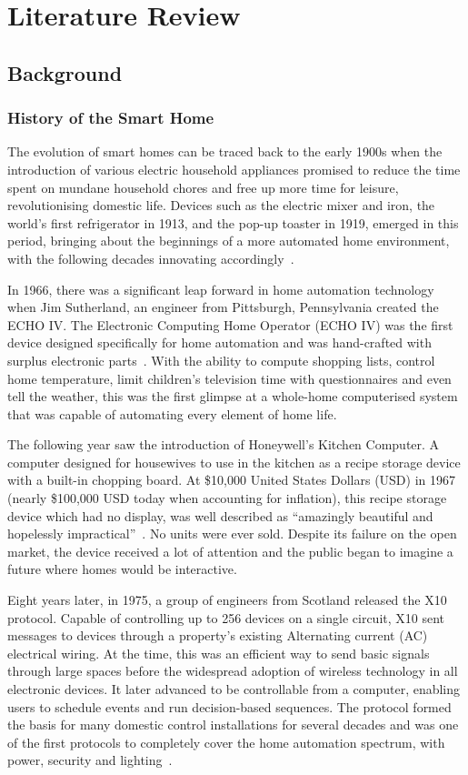 \chapter{Literature Review}\label{ch:lit_review}

\section{Background}

\subsection{History of the Smart Home}
The evolution of smart homes can be traced back to the early 1900s when the introduction of various electric household appliances promised to reduce the time spent on mundane household chores and free up more time for leisure, revolutionising domestic life.
Devices such as the electric mixer and iron, the world's first refrigerator in 1913, and the pop-up toaster in 1919, emerged in this period, bringing about the beginnings of a more automated home environment, with the following decades innovating accordingly~\cite{Hert16}.

In 1966, there was a significant leap forward in home automation technology when Jim Sutherland, an engineer from Pittsburgh, Pennsylvania created the ECHO IV.
The Electronic Computing Home Operator (ECHO IV) was the first device designed specifically for home automation and was hand-crafted with surplus electronic parts~\cite{Spic16}.
With the ability to compute shopping lists, control home temperature, limit children's television time with questionnaires and even tell the weather, this was the first glimpse at a whole-home computerised system that was capable of automating every element of home life.

The following year saw the introduction of Honeywell's Kitchen Computer.
A computer designed for housewives to use in the kitchen as a recipe storage device with a built-in chopping board.
At \$10,000 United States Dollars (USD) in 1967 (nearly \$100,000 USD today when accounting for inflation), this recipe storage device which had no display, was well described as ``amazingly beautiful and hopelessly impractical''~\cite{MANA23,Stei11,USIC}.
No units were ever sold.
Despite its failure on the open market, the device received a lot of attention and the public began to imagine a future where homes would be interactive.

Eight years later, in 1975, a group of engineers from Scotland released the X10 protocol.
Capable of controlling up to 256 devices on a single circuit, X10 sent messages to devices through a property's existing Alternating current (AC) electrical wiring.
At the time, this was an efficient way to send basic signals through large spaces before the widespread adoption of wireless technology in all electronic devices.
It later advanced to be controllable from a computer, enabling users to schedule events and run decision-based sequences.
The protocol formed the basis for many domestic control installations for several decades and was one of the first protocols to completely cover the home automation spectrum, with power, security and lighting~\cite{X10}.

